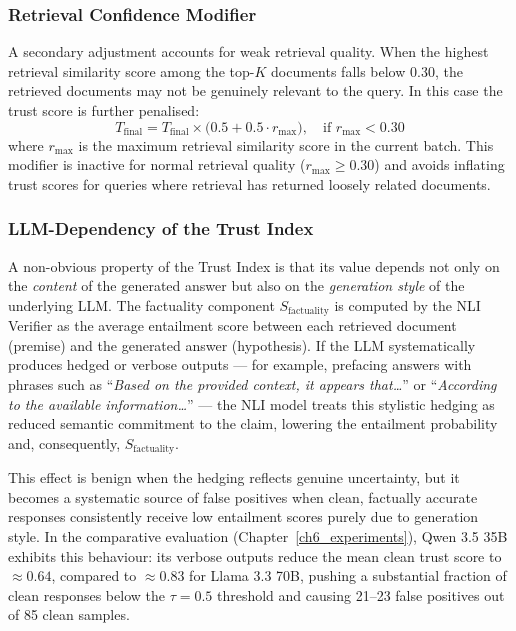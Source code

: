 \subsubsection{Retrieval Confidence Modifier}

A secondary adjustment accounts for weak retrieval quality. When the highest retrieval
similarity score among the top-$K$ documents falls below 0.30, the retrieved documents
may not be genuinely relevant to the query. In this case the trust score is further
penalised:
\begin{equation}
\label{eq:retrieval_confidence}
T_{\text{final}} = T_{\text{final}} \times \bigl(0.5 + 0.5 \cdot r_{\max}\bigr),
\quad \text{if } r_{\max} < 0.30
\end{equation}
where $r_{\max}$ is the maximum retrieval similarity score in the current batch. This
modifier is inactive for normal retrieval quality ($r_{\max} \geq 0.30$) and avoids
inflating trust scores for queries where retrieval has returned loosely related documents.

\subsubsection{LLM-Dependency of the Trust Index}
\label{subsubsec:llm_dependency}

A non-obvious property of the Trust Index is that its value depends not only on the
\textit{content} of the generated answer but also on the \textit{generation style} of the
underlying LLM. The factuality component $S_{\text{factuality}}$ is computed by the NLI
Verifier as the average entailment score between each retrieved document (premise) and the
generated answer (hypothesis). If the LLM systematically produces hedged or verbose outputs
--- for example, prefacing answers with phrases such as ``\textit{Based on the provided
context, it appears that\ldots}'' or ``\textit{According to the available information\ldots}''
--- the NLI model treats this stylistic hedging as reduced semantic commitment to the claim,
lowering the entailment probability and, consequently, $S_{\text{factuality}}$.

This effect is benign when the hedging reflects genuine uncertainty, but it becomes a
systematic source of false positives when clean, factually accurate responses consistently
receive low entailment scores purely due to generation style. In the comparative evaluation
(Chapter~\ref{ch6_experiments}), Qwen 3.5 35B exhibits this behaviour: its verbose outputs
reduce the mean clean trust score to $\approx 0.64$, compared to $\approx 0.83$ for
Llama 3.3 70B, pushing a substantial fraction of clean responses below the $\tau = 0.5$
threshold and causing 21--23 false positives out of 85 clean samples.

